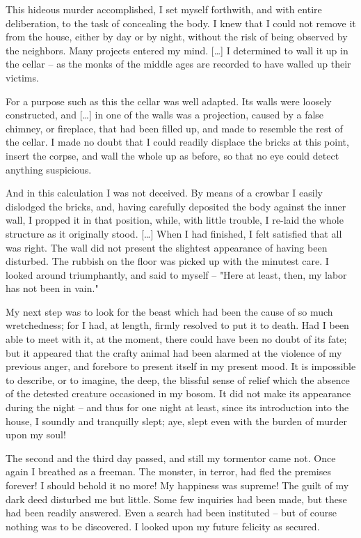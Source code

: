 \documentclass[11pt,a4paper]{article}
\begin{document}
This hideous murder accomplished, I set myself forthwith, and with entire deliberation, to the task of concealing the body. I knew that I could not remove it from the house, either by day or by night, without the risk of being observed by the neighbors. Many projects entered my mind. […] I determined to wall it up in the cellar -- as the monks of the middle ages are recorded to have walled up their victims.

For a purpose such as this the cellar was well adapted. Its walls were loosely constructed, and […] in one of the walls was a projection, caused by a false chimney, or fireplace, that had been filled up, and made to resemble the rest of the cellar. I made no doubt that I could readily displace the bricks at this point, insert the corpse, and wall the whole up as before, so that no eye could detect anything suspicious.

And in this calculation I was not deceived. By means of a crowbar I easily dislodged the bricks, and, having carefully deposited the body against the inner wall, I propped it in that position, while, with little trouble, I re-laid the whole structure as it originally stood. […] When I had finished, I felt satisfied that all was right. The wall did not present the slightest appearance of having been disturbed. The rubbish on the floor was picked up with the minutest care. I looked around triumphantly, and said to myself -- "Here at least, then, my labor has not been in vain."

My next step was to look for the beast which had been the cause of so much wretchedness; for I had, at length, firmly resolved to put it to death. Had I been able to meet with it, at the moment, there could have been no doubt of its fate; but it appeared that the crafty animal had been alarmed at the violence of my previous anger, and forebore to present itself in my present mood. It is impossible to describe, or to imagine, the deep, the blissful sense of relief which the absence of the detested creature occasioned in my bosom. It did not make its appearance during the night -- and thus for one night at least, since its introduction into the house, I soundly and tranquilly slept; aye, slept even with the burden of murder upon my soul!

The second and the third day passed, and still my tormentor came not. Once again I breathed as a freeman. The monster, in terror, had fled the premises forever! I should behold it no more! My happiness was supreme! The guilt of my dark deed disturbed me but little. Some few inquiries had been made, but these had been readily answered. Even a search had been instituted -- but of course nothing was to be discovered. I looked upon my future felicity as secured.
\end{document}
